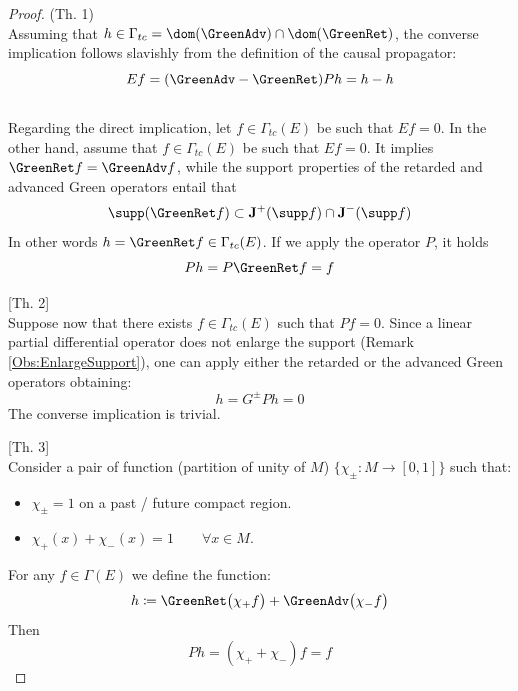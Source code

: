 \documentclass[Main]{subfiles}
\begin{document}
			\begin{proof}
			(Th. 1)\\
			Assuming that $h\in \Gamma_{tc} = \dom(\GreenAdv) \cap \dom(\GreenRet)$, the converse implication follows slavishly from the definition of the causal propagator:
			\begin{displaymath}
				E f= (\GreenAdv - \GreenRet) P h = h -h
			\end{displaymath}
			\\
			\ifToninus Regarding the direct implication, let $f \in \Gamma_{tc}(E)$ be such that $E f = 0$.
			\else In the other hand, assume that $f \in \Gamma_{tc}(E)$ be such that $E f = 0$.
			It implies $\GreenRet f = \GreenAdv f $, while the support properties of the retarded and advanced Green operators entail that
			\begin{displaymath}
				\supp (\GreenRet f ) \subset \mathbf{J}^+ (\supp f) \cap \mathbf{J}^- (\supp f)
			\end{displaymath}
			 In other words $h = \GreenRet f \in \Gamma_{tc}(E)$. 
			 If we apply the operator $P$, it holds 
			 \begin{displaymath}
			 	P h = P \GreenRet f = f
			 \end{displaymath}
			
			[Th. 2]\\
			Suppose now that there exists $f \in \Gamma_{tc}(E)$ such that $Pf = 0$. Since a linear partial differential operator does not enlarge the support (Remark \ref{Obs:EnlargeSupport}), one can apply either
the retarded or the advanced Green operators obtaining:
			\begin{displaymath}
				h = G^\pm P h = 0
			\end{displaymath}
			The converse implication is trivial.
			
			[Th. 3]\\
			Consider a pair of function (partition of unity of $M$) $\{\chi_\pm: M \rightarrow [0,1] \}$ such that:
			\begin{itemize}
				\item $\chi_\pm = 1$ on a past / future compact region.
				\item $\chi_+(x) + \chi_-(x) = 1 \qquad \forall x\in M$.
			\end{itemize}
			For any $f \in 	\Gamma(E)$ we define the function:
			\begin{displaymath}
				h \coloneqq \GreenRet \big( \chi_+ f \big) + \GreenAdv \big( \chi_- f \big)
			\end{displaymath}
			Then
			\begin{displaymath}
				P h = (\chi_+ + \chi_-)f = f
			\end{displaymath}
			\end{proof}
			
\end{document}
